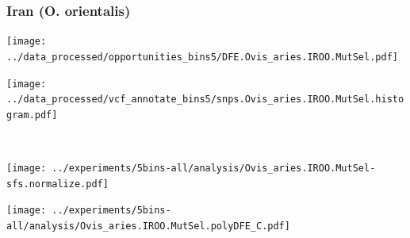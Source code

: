 \subsubsection{Iran (O. orientalis)}

\begin{minipage}{0.49\linewidth}
    \texttt{[image: ../data\_processed/opportunities\_bins5/DFE.Ovis\_aries.IROO.MutSel.pdf]}
\end{minipage}
\begin{minipage}{0.49\linewidth}
    \texttt{[image: ../data\_processed/vcf\_annotate\_bins5/snps.Ovis\_aries.IROO.MutSel.histogram.pdf]}
\end{minipage}
\\
\begin{minipage}{0.49\linewidth}
    \texttt{[image: ../experiments/5bins-all/analysis/Ovis\_aries.IROO.MutSel-sfs.normalize.pdf]}
\end{minipage}
\begin{minipage}{0.4\linewidth}
    \texttt{[image: ../experiments/5bins-all/analysis/Ovis\_aries.IROO.MutSel.polyDFE\_C.pdf]}
\end{minipage}
